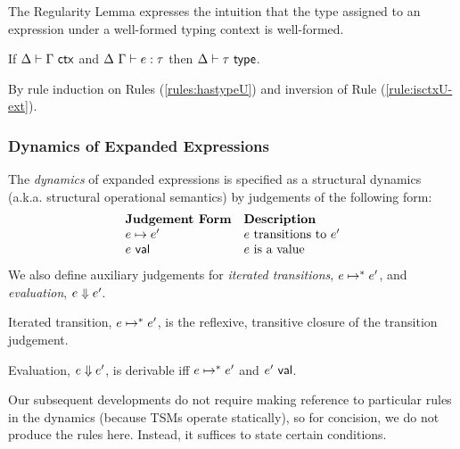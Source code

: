 The Regularity Lemma expresses the intuition that the type assigned to an expression under a well-formed typing context is well-formed. 
\begin{lemma}[Regularity]\label{lemma:regularity-U} If $\Delta \vdash \Gamma~\mathsf{ctx}$ and $\Delta~\Gamma \vdash e : \tau$ then $\Delta \vdash \tau~\mathsf{type}$.\end{lemma}
\begin{proof-sketch}
By rule induction on Rules (\ref{rules:hastypeU}) and inversion of Rule (\ref{rule:isctxU-ext}). 
\end{proof-sketch}
\subsubsection{Dynamics of Expanded Expressions}
The \emph{dynamics} of expanded expressions is specified as a structural dynamics (a.k.a. structural operational semantics) by judgements of the following form:
\[\begin{array}{ll}
\textbf{Judgement Form} & \textbf{Description}\\
e \mapsto e' & \text{$e$ transitions to $e'$}\\
e~\mathsf{val} & \text{$e$ is a value}
\end{array}\]
We also define auxiliary judgements for \emph{iterated transitions}, $e \mapsto^{*} e'$, and \emph{evaluation}, $e \Downarrow e'$.

\begin{definition}\label{defn:iterated-transition-U} Iterated transition, $e \mapsto^{*} e'$, is the reflexive, transitive closure of the transition judgement.\end{definition}

\begin{definition}[Evaluation]\label{defn:evaluation-U} Evaluation, $e \Downarrow e'$, is derivable iff $e \mapsto^{*} e'$ and $e'~\mathsf{val}$. \end{definition}

Our subsequent developments do not require making reference to particular rules in the dynamics (because TSMs operate statically), so for concision, we do not produce the rules here. Instead, it suffices to state certain conditions.


